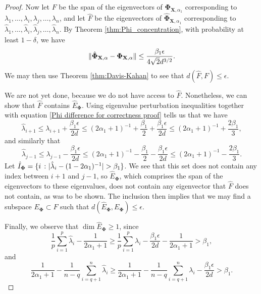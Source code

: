 \documentclass[final,12pt]{colt2018} %
\numberwithin{equation}{section}
\DeclarePairedDelimiter{\abs}{\lvert}{\rvert}
\DeclarePairedDelimiter{\norm}{\lVert}{\rVert}
\DeclarePairedDelimiter{\braces}{\lbrace}{\rbrace}
\newcommand{\boldPhi}{\boldsymbol{\Phi}}
\newcommand{\boldX}{\textbf{X}}
\begin{document}
\begin{proof}
	Now let $F$ be the span of the eigenvectors of $\boldPhi_{\boldX,\alpha_1}$ corresponding to $\lambda_1,\ldots,\lambda_i,\lambda_j,\ldots,\lambda_n$, and let $\hat{F}$ be the eigenvectors of $\hat{\boldPhi}_{\boldX,\alpha_1}$ corresponding to $\hat{\lambda}_1,\ldots,\hat{\lambda}_i,\hat{\lambda}_j,\ldots,\hat{\lambda}_n$. By Theorem \ref{thm:Phi_concentration}, with probability at least $1-\delta$, we have
	\begin{equation} \label{Phi difference for correctness proof}
	\norm{\hat{\boldPhi}_{\boldX,\alpha} - \boldPhi_{\boldX,\alpha}} \leq \frac{\beta_1\epsilon}{4\sqrt{2}d^{3/2}}.
	\end{equation}
	We may then use Theorem \ref{thm:Davis-Kahan} to see that $d(\hat{F},F) \leq \epsilon$.
	
	We are not yet done, because we do not have access to $\hat{F}$. Nonetheless, we can show that $\hat{F}$ contains $\hat{E}_{\boldPhi}$. Using eigenvalue perturbation inequalities together with equation \eqref{Phi difference for correctness proof} tells us that we have
	\begin{equation}
	\hat{\lambda}_{i+1} \leq \lambda_{i+1} + \frac{\beta_1\epsilon}{2d} \leq (2\alpha_1+1)^{-1} + \frac{\beta_1}{2} + \frac{\beta_1\epsilon}{2d} \leq (2\alpha_1+1)^{-1} + \frac{2\beta_1}{3},
	\end{equation}
	and similarly that
	\begin{equation}
	\hat{\lambda}_{j-1} \leq \lambda_{j-1} - \frac{\beta_1\epsilon}{2d} \leq (2\alpha_1+1)^{-1} - \frac{\beta_1}{2} - \frac{\beta_1\epsilon}{2d} \leq (2\alpha_1+1)^{-1} - \frac{2\beta_1}{3}.
	\end{equation}
	Let $\hat{I}_{\boldPhi} = \braces{i \ \colon \abs{\hat{\lambda}_i - (1-2\alpha_1)^{-1}} > \beta_1}$. We see that this set does not contain any index between $i+1$ and $j-1$, so $\hat{E}_{\boldPhi}$, which comprises the span of the eigenvectors to these eigenvalues, does not contain any eigenvector that $\hat{F}$ does not contain, as was to be shown. The inclusion then implies that we may find a subspace $E_{\boldPhi} \subset F$ such that $d(\hat{E}_{\boldPhi},E_{\boldPhi}) \leq \epsilon$.
	
	Finally, we observe that $\dim{\hat{E}_{\boldPhi}} \geq 1$, since
	\begin{equation}
	\frac{1}{p}\sum_{i=1}^p\hat{\lambda}_i - \frac{1}{2\alpha_1+1} \geq \frac{1}{p}\sum_{i=1}^p\lambda_i - \frac{\beta_1\epsilon}{2d} - \frac{1}{2\alpha_1+1} > \beta_1,
	\end{equation}
	and
	\begin{equation}
	\frac{1}{2\alpha_1+1} - \frac{1}{n-q}\sum_{i=q+1}^n\hat{\lambda}_i \geq \frac{1}{2\alpha_1+1} - \frac{1}{n-q}\sum_{i=q+1}^n\lambda_i - \frac{\beta_1\epsilon}{2d} > \beta_1.
	\end{equation}	
\end{proof}
\end{document}
